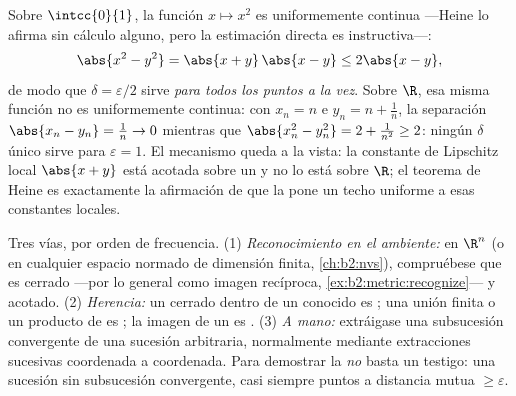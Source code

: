 \begin{example}\label{ex:b2:metric:heinework}
Sobre $\intcc{0}{1}$, la función $x \mapsto x^2$ es uniformemente
continua ---Heine lo afirma sin cálculo alguno, pero la estimación
directa es instructiva---:
\[
\abs{x^2 - y^2} = \abs{x + y}\,\abs{x - y} \leq 2\abs{x - y},
\]
de modo que $\delta = \varepsilon/2$ sirve \emph{para todos los
puntos a la vez}. Sobre $\R$, esa misma función no es uniformemente
continua: con $x_n = n$ e $y_n = n + \frac1n$, la separación
$\abs{x_n - y_n} = \frac1n \to 0$ mientras que $\abs{x_n^2 -
y_n^2} = 2 + \frac1{n^2} \geq 2$: ningún $\delta$ único sirve para
$\varepsilon = 1$. El mecanismo queda a la vista: la constante de
Lipschitz local $\abs{x + y}$ está acotada sobre un  y no
lo está sobre $\R$; el teorema de Heine es exactamente la
afirmación de que la  pone un techo uniforme a esas
constantes locales.
\end{example}

\begin{method}\label{met:b2:metric:compactness}
Tres vías, por orden de frecuencia. (1) \emph{Reconocimiento en el
ambiente:} en $\R^n$ (o en cualquier espacio normado de dimensión
finita, \cref{ch:b2:nvs}), compruébese que es cerrado ---por lo
general como imagen recíproca, \cref{ex:b2:metric:recognize}--- y
acotado. (2) \emph{Herencia:} un cerrado dentro de un 
conocido es ; una unión finita o un producto de
 es ; la imagen  de un  es
. (3) \emph{A mano:} extráigase una subsucesión convergente
de una sucesión arbitraria, normalmente mediante extracciones
sucesivas coordenada a coordenada. Para demostrar la \emph{no}
 basta un testigo: una sucesión sin subsucesión
convergente, casi siempre puntos a distancia mutua $\geq
\varepsilon$.
\end{method}

